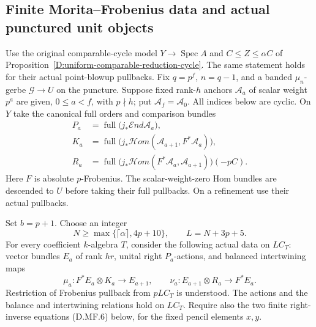 \subsection{Finite Morita--Frobenius data and actual punctured unit objects}

\begin{theorem}
\label{D:finite-Morita-Frobenius-object-effectivity}
Use the original comparable-cycle model $Y\to\operatorname{Spec}A$
and $C\le Z\le\alpha C$ of
Proposition~\ref{D:uniform-comparable-reduction-cycle}.
The same statement holds for their actual point-blowup pullbacks.
Fix $q=p^f$, $n=q-1$, and a banded $\mu_n$-gerbe
$\mathcal G\to U$ on the puncture. Suppose fixed rank-$h$
anchors $\mathcal A_a$ of scalar weight $p^a$ are given,
$0\le a<f$, with $p\nmid h$; put $\mathcal A_f=\mathcal A_0$.
All indices below are cyclic. On $Y$ take the canonical full
orders and comparison bundles
\[
 \begin{aligned}
 P_a&=\operatorname{full}\bigl(j_*\mathcal End\mathcal A_a\bigr),\\
 K_a&=\operatorname{full}\bigl(j_*\mathcal Hom(
                   \mathcal A_{a+1},F^*\mathcal A_a)\bigr),\\
 R_a&=\operatorname{full}\bigl(j_*\mathcal Hom(
                   F^*\mathcal A_a,\mathcal A_{a+1})\bigr)(-pC).
 \end{aligned}                                         \tag{D.MF.1}
\]
Here $F$ is absolute $p$-Frobenius. The scalar-weight-zero
Hom bundles are descended to $U$ before taking their full
pullbacks. On a refinement use their actual pullbacks.

Set $b=p+1$. Choose an integer
\[
 N\ge\max\{\lceil\alpha\rceil,4p+10\},\qquad
                       L=N+3p+5.                      \tag{D.MF.2}
\]
For every coefficient $k$-algebra $T$, consider the following
actual data on $LC_T$: vector bundles $E_a$ of rank $hr$,
unital right $P_a$-actions, and balanced intertwining maps
\[
 \mu_a:F^*E_a\otimes K_a\longrightarrow E_{a+1},\qquad
 \nu_a:E_{a+1}\otimes R_a\longrightarrow F^*E_a.
                                                        \tag{D.MF.3}
\]
Restriction of Frobenius pullback from $pLC_T$ is understood.
The actions and the balance and intertwining relations hold on
$LC_T$. Require also the two finite right-inverse equations
(D.MF.6) below, for the fixed pencil elements $x,y$.


\end{theorem}
